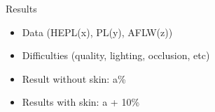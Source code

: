 
\begin{xpsectionbox}{Results}{}

\begin{itemize}
	\item Data (HEPL(x), PL(y), AFLW(z))
	\item Difficulties (quality, lighting, occlusion, etc)
	\item Result without skin: a\%
	\item Results with skin: a + 10\%
		
\end{itemize}
\end{xpsectionbox}


%
%
%
%
